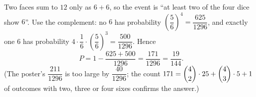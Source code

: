 Two faces sum to $12$ only as $6+6$, so the event is ``at least two of the four dice show $6$''. Use the complement: no $6$ has probability $\left(\dfrac{5}{6}\right)^4=\dfrac{625}{1296}$, and exactly one $6$ has probability $4\cdot\dfrac{1}{6}\cdot\left(\dfrac{5}{6}\right)^3=\dfrac{500}{1296}$. Hence
\[
P=1-\dfrac{625+500}{1296}=\dfrac{171}{1296}=\boxed{\dfrac{19}{144}}.
\]
(The poster's $\dfrac{211}{1296}$ is too large by $\dfrac{40}{1296}$; the count $171=\dbinom42\cdot25+\dbinom43\cdot5+1$ of outcomes with two, three or four sixes confirms the answer.)
